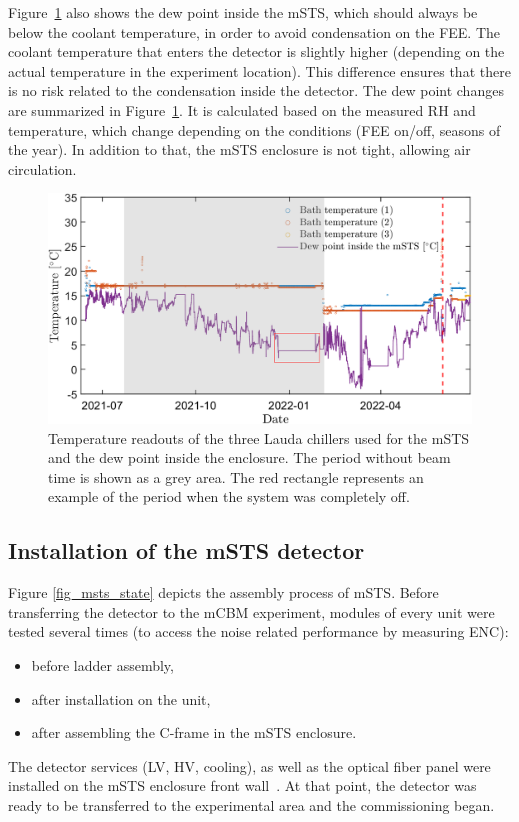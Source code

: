 Figure~\ref{fig_cooling} also shows the dew point inside the \gls{mSTS}, which should always be below the coolant temperature, in order to avoid condensation on the \gls{FEE}. The coolant temperature that enters the detector is slightly higher (depending on the actual temperature in the experiment location). This difference ensures that there is no risk related to the condensation inside the detector. The dew point changes are summarized in Figure~\ref{fig_cooling}. It is calculated based on the measured \gls{RH} and temperature, which change depending on the conditions (\gls{FEE} on/off, seasons of the year). In addition to that, the \gls{mSTS} enclosure is not tight,  allowing air circulation.
\begin{figure}[!h]
\centering
\includegraphics[width=0.95\columnwidth]{Chapter6/DCS/images/cooling.png}
\caption{Temperature readouts of the three Lauda chillers used for the \gls{mSTS} and the dew point inside the enclosure. The period without beam time is shown as a grey area. The red rectangle represents an example of the period when the system was completely off.}
\label{fig_cooling}
\end{figure}

\subsection{Installation of the mSTS detector}
Figure \ref{fig_msts_state} depicts the assembly process of \gls{mSTS}. Before transferring the detector to the \gls{mCBM} experiment, modules of every unit were tested several times (to access the noise related performance by measuring ENC):
\begin{itemize}
    \item before ladder assembly,
    \item after installation on the unit,
    \item after assembling the C-frame in the mSTS enclosure.
\end{itemize}
The detector services (\gls{LV}, \gls{HV}, cooling), as well as the optical fiber panel were installed on the \gls{mSTS} enclosure front wall~\cite{tekli1}. At that point, the detector was ready to be transferred to the experimental area and the commissioning began.

